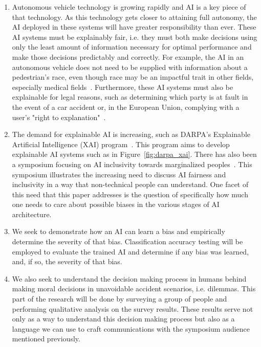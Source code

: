 \documentclass{report}
\begin{document}
\begin{enumerate}
    \item Autonomous vehicle technology is growing rapidly and AI is a key piece of that technology.
    As this technology gets closer to attaining full autonomy, the AI deployed in these systems will
    have greater responsibility than ever. These AI systems must be explainably fair, i.e. they must
    both make decisions using only the least amount of information necessary for optimal performance
    and make those decisions predictably and correctly. For example, the AI in an autonomous vehicle
    does not need to be supplied with information about a pedestrian's race, even though race may be
    an impactful trait in other fields, especially medical fields~\cite{sickeCellDisease}.
    Furthermore, these AI systems must also be explainable for legal reasons, such as determining
    which party is at fault in the event of a car accident or, in the European Union, complying with
    a user's "right to explanation"~\cite{goodman2017european}.
    
    \item The demand for explainable AI is increasing, such as DARPA's Explainable Artificial
    Intelligence (XAI) program~\cite{gunning2016explainable}. This program aims to develop
    explainable AI systems such as in Figure~\ref{fig:darpa_xai}. There has also been a symposium
    focusing on AI inclusivity towards marginalized
    peoples~\cite{berkmanKleinCenterAI2017,aiAndInclusionSymposium}. This symposium illustrates the
    increasing need to discuss AI fairness and inclusivity in a way that non-technical people can
    understand. One facet of this need that this paper addresses is the question of specifically how
    much one needs to care about possible biases in the various stages of AI architecture.
    
    \item We seek to demonstrate how an AI can learn a bias and empirically determine the severity
    of that bias. Classification accuracy testing will be employed to evaluate the trained AI and
    determine if any bias was learned, and, if so, the severity of that bias.

    \item We also seek to understand the decision making process in humans behind making moral
    decisions in unavoidable accident scenarios, i.e. dilemmas. This part of the research will be
    done by surveying a group of people and performing qualitative analysis on the survey results.
    These results serve not only as a way to understand this decision making process but also as a
    language we can use to craft communications with the symposium audience mentioned previously.
\end{enumerate}
\end{document}

